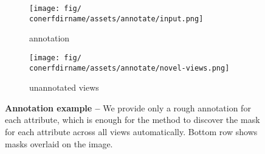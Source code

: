 \begin{figure}
  \centering
  \begin{subfigure}[b]{0.164\linewidth}
    \centering
    \texttt{[image: fig/\\conerfdirname/assets/annotate/input.png]}
    \caption{annotation}
  \end{subfigure}
  \hfill{}
  \begin{subfigure}[b]{0.816\linewidth}
    \centering
    \texttt{[image: fig/\\conerfdirname/assets/annotate/novel-views.png]}
    \caption{unannotated views}
  \end{subfigure}
  \caption{{\bf Annotation example -- }
    We provide only a rough annotation for each attribute, which is enough for
    the method to discover the mask for each attribute across all views
    automatically.
    Bottom row shows masks overlaid on the image.
  }
  \label{fig:conerf-annotate}
\end{figure}